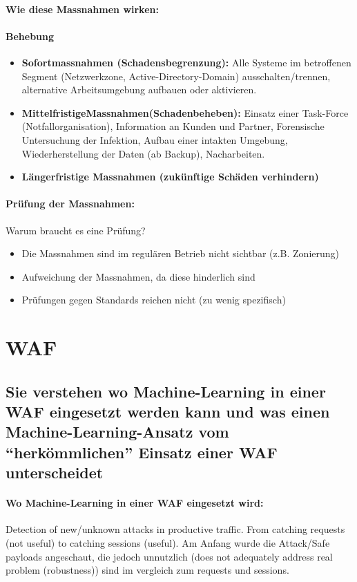 \documentclass[10pt,a4paper]{article}
\begin{document}
\paragraph*{Wie diese Massnahmen wirken:}
\paragraph*{Behebung}
\begin{itemize}[noitemsep,topsep=0pt,leftmargin=*]
	\item \textbf{Sofortmassnahmen (Schadensbegrenzung):} Alle Systeme im betroffenen Segment (Netzwerkzone, Active-Directory-Domain) ausschalten/trennen, alternative Arbeitsumgebung aufbauen oder aktivieren.
	\item \textbf{MittelfristigeMassnahmen(Schadenbeheben):} Einsatz einer Task-Force (Notfallorganisation), Information an Kunden und Partner, Forensische Untersuchung der Infektion, Aufbau einer intakten Umgebung, Wiederherstellung der Daten (ab Backup), Nacharbeiten.
	\item \textbf{Längerfristige Massnahmen (zukünftige Schäden verhindern)}
\end{itemize}
\paragraph*{Prüfung der Massnahmen:} Warum braucht es eine Prüfung?
\begin{itemize}[noitemsep,topsep=0pt,leftmargin=*]
    \item Die Massnahmen sind im regulären Betrieb nicht sichtbar (z.B. Zonierung)
    \item Aufweichung der Massnahmen, da diese hinderlich sind
    \item Prüfungen gegen Standards reichen nicht (zu wenig spezifisch)
\end{itemize}

\section{WAF}
\subsection*{Sie verstehen wo Machine-Learning in einer WAF eingesetzt werden kann und was einen Machine-Learning-Ansatz vom "`herkömmlichen"' Einsatz einer WAF unterscheidet}
\paragraph*{Wo Machine-Learning in einer WAF eingesetzt wird:} Detection of new/unknown attacks in productive traffic. From catching requests (not useful) to catching sessions (useful). Am Anfang wurde die Attack/Safe payloads angeschaut, die jedoch unnutzlich (does not adequately address real problem (robustness)) sind im vergleich zum requests und sessions.
\end{document}
